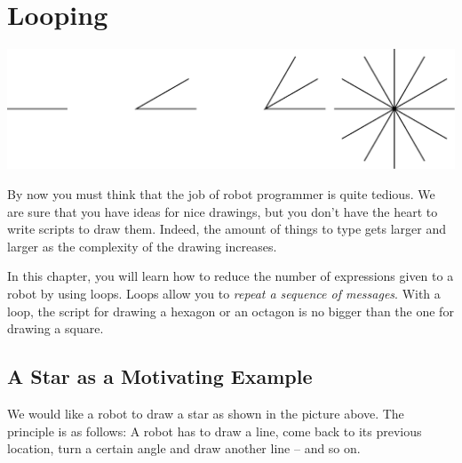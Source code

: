 
\ifx\wholebook\relax\else



\fi

\chapter{Looping}\label{ch:looping}\label{cha:loops}

\begin{chapterfigure}
\includegraphics[width=0.9\linewidth]{loopTitlePicture}
\end{chapterfigure}



By now you must think that the job of robot programmer is quite
tedious. We are sure that you have ideas for nice drawings, but you don't
have the heart to write scripts to draw them.  Indeed, the amount of things to type gets larger and larger as the complexity of the drawing increases. 
  
In this chapter, you will learn how to reduce the number of expressions given to a robot by using loops. Loops allow you to \emph{repeat a sequence of messages}. With a loop, the script for drawing a hexagon or an octagon is no bigger than the one for drawing a square.

\section{A Star as a Motivating Example}
We would like a robot to draw a star as shown in the picture above. The principle is as follows: A robot has to draw a line, come back to its previous location, turn a certain angle and draw another line -- and so on. 

